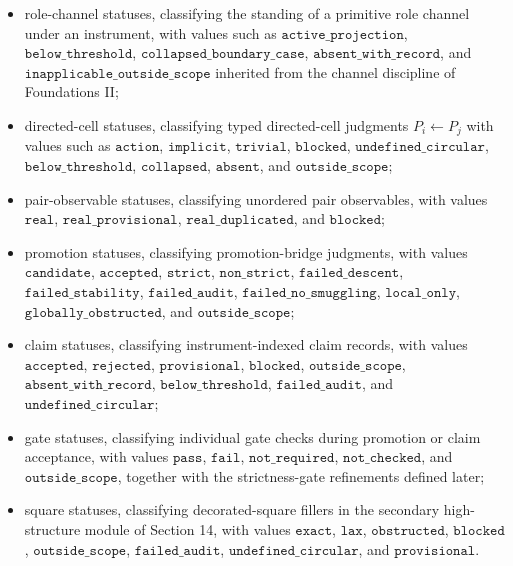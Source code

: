 \documentclass[11pt]{article}
\providecommand{\tightlist}{}
\theoremstyle{definition}
\begin{document}
\begin{itemize}
\tightlist
\item
  role-channel statuses, classifying the standing of a primitive role channel under an instrument, with values such as \(\texttt{active\_projection}\), \(\texttt{below\_threshold}\), \(\texttt{collapsed\_boundary\_case}\), \(\texttt{absent\_with\_record}\), and \(\texttt{inapplicable\_outside\_scope}\) inherited from the channel discipline of Foundations II;
\item
  directed-cell statuses, classifying typed directed-cell judgments \(P_i\leftarrow P_j\) with values such as \(\texttt{action}\), \(\texttt{implicit}\), \(\texttt{trivial}\), \(\texttt{blocked}\), \(\texttt{undefined\_circular}\), \(\texttt{below\_threshold}\), \(\texttt{collapsed}\), \(\texttt{absent}\), and \(\texttt{outside\_scope}\);
\item
  pair-observable statuses, classifying unordered pair observables, with values \(\texttt{real}\), \(\texttt{real\_provisional}\), \(\texttt{real\_duplicated}\), and \(\texttt{blocked}\);
\item
  promotion statuses, classifying promotion-bridge judgments, with values \(\texttt{candidate}\), \(\texttt{accepted}\), \(\texttt{strict}\), \(\texttt{non\_strict}\), \(\texttt{failed\_descent}\), \(\texttt{failed\_stability}\), \(\texttt{failed\_audit}\), \(\texttt{failed\_no\_smuggling}\), \(\texttt{local\_only}\), \(\texttt{globally\_obstructed}\), and \(\texttt{outside\_scope}\);
\item
  claim statuses, classifying instrument-indexed claim records, with values \(\texttt{accepted}\), \(\texttt{rejected}\), \(\texttt{provisional}\), \(\texttt{blocked}\), \(\texttt{outside\_scope}\), \(\texttt{absent\_with\_record}\), \(\texttt{below\_threshold}\), \(\texttt{failed\_audit}\), and \(\texttt{undefined\_circular}\);
\item
  gate statuses, classifying individual gate checks during promotion or claim acceptance, with values \(\texttt{pass}\), \(\texttt{fail}\), \(\texttt{not\_required}\), \(\texttt{not\_checked}\), and \(\texttt{outside\_scope}\), together with the strictness-gate refinements defined later;
\item
  square statuses, classifying decorated-square fillers in the secondary high-structure module of Section 14, with values \(\texttt{exact}\), \(\texttt{lax}\), \(\texttt{obstructed}\), \(\texttt{blocked}\), \(\texttt{outside\_scope}\), \(\texttt{failed\_audit}\), \(\texttt{undefined\_circular}\), and \(\texttt{provisional}\).
\end{itemize}
\end{document}
